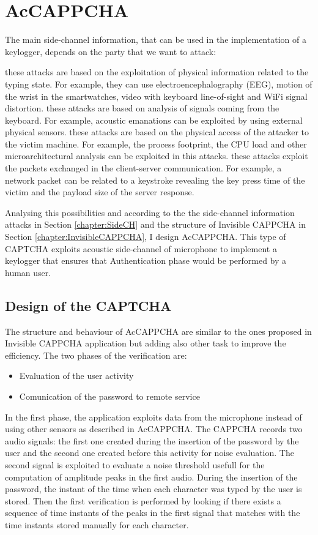 \chapter{AcCAPPCHA}
The main side-channel information, that can be used in the implementation of a keylogger, depends on the party that we want to attack\cite{keylogging}:
\begin{itemize}
{these attacks are based on the exploitation of physical information related to the typing state. For example, they can use electroencephalography (EEG), motion of the wrist in the smartwatches, video with keyboard line-of-sight and WiFi signal distortion. }
{these attacks are based on analysis of signals coming from the keyboard. For example, acoustic emanations can be exploited by using external physical sensors.}
{these attacks are based on the physical access of the attacker to the victim machine. For example, the process footprint, the CPU load and other microarchitectural analysis can be exploited in this attacks.}
{these attacks exploit the packets exchanged in the client-server communication. For example, a network packet can be related to a keystroke revealing the key press time of the victim and the payload size of the server response.}
\end{itemize}
Analysing this possibilities and according to the the side-channel information attacks in Section \ref{chapter:SideCH} and the structure of Invisible CAPPCHA in Section \ref{chapter:InvisibleCAPPCHA}, I design AcCAPPCHA. This type of CAPTCHA exploits acoustic side-channel of microphone to implement a keylogger that ensures that Authentication phase would be performed by a human user.
\section{Design of the CAPTCHA}
The structure and behaviour of AcCAPPCHA are similar to the ones proposed in Invisible CAPPCHA application but adding also other task to improve the efficiency. The two phases of the verification are:
\begin{itemize}
\item{Evaluation of the user activity}
\item{Comunication of the password to remote service}
\end{itemize}
In the first phase, the application exploits data from the microphone instead of using other sensors as described in AcCAPPCHA. The CAPPCHA records two audio signals: the first one created during the insertion of the password by the user and the second one created before this activity for noise evaluation. The second signal is exploited to evaluate a noise threshold usefull for the computation of amplitude peaks in the first audio. During the insertion of the password, the instant of the time when each character was typed by the user is stored. Then the first verification is performed by looking if there exists a sequence of time instants of the peaks in the first signal that matches with the time instants stored manually for each character. 